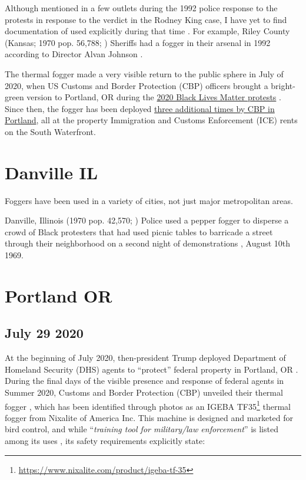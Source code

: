 \documentclass[
  11pt,
]{krantz}
\renewcommand{\href}[2]{#2\footnote{\url{#1}}}
\begin{document}
Although mentioned in a few outlets during the 1992 police response to the protests in response to the verdict in the Rodney King case, I have yet to find documentation of used explicitly during that time \citep{Askren1992}.
For example, Riley County (Kansas; 1970 pop. 56,788; \citet{USCB1970}) Sheriffs had a fogger in their arsenal in 1992 according to Director Alvan Johnson \citep{Askren1992}.

The thermal fogger made a very visible return to the public sphere in July of 2020, when US Customs and Border Protection (CBP) officers brought a bright-green version to Portland, OR during the \protect\hyperlink{PortlandOR2020_07_29}{2020 Black Lives Matter protests} \citep{pb20202021}.
Since then, the fogger has been deployed \protect\hyperlink{PortlandORICE2020_2021}{three additional times by CBP in Portland}, all at the property Immigration and Customs Enforcement (ICE) rents on the South Waterfront.

\hypertarget{danville-il}{%
\section*{Danville IL}\label{danville-il}}


Foggers have been used in a variety of cities, not just major metropolitan areas.

Danville, Illinois (1970 pop. 42,570; \citep{USCB1970}) Police used a pepper fogger to disperse a crowd of Black protesters that had used picnic tables to barricade a street through their neighborhood on a second night of demonstrations \citep{Palladium-Item1969}, August 10th 1969.

\hypertarget{PortlandOR2020_2021}{%
\section*{Portland OR}\label{PortlandOR2020_2021}}


\hypertarget{PortlandOR2020_07_29}{%
\subsection*{July 29 2020}\label{PortlandOR2020_07_29}}


At the beginning of July 2020, then-president Trump deployed Department of Homeland Security (DHS) agents to ``protect'' federal property in Portland, OR \citep{DHS2020, Flanigan2020, Trump2020}.
During the final days of the visible presence and response of federal agents in Summer 2020, Customs and Border Protection (CBP) unveiled their thermal fogger \citep{Recompiler2020_07_29}, which has been identified through photos as an \href{https://www.nixalite.com/product/igeba-tf-35}{IGEBA TF35} thermal fogger from Nixalite of America Inc.
This machine is designed and marketed for bird control, and while ``\emph{training tool for military/law enforcement}'' is listed among its uses \citep{Nixalite2009a}, its safety requirements explicitly state:
\end{document}
